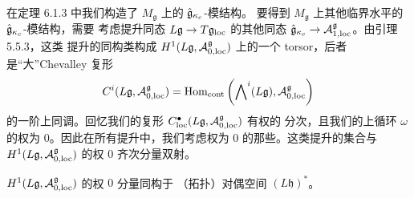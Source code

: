 在定理 6.1.3 中我们构造了 $M_{\mathfrak g}$ 上的 $\hat{\mathfrak{g}}_{\kappa_c}$-模结构。
要得到 $M_{\mathfrak g}$ 上其他临界水平的 $\hat{\mathfrak{g}}_{\kappa_c}$-模结构，需要
考虑提升同态 $L\mathfrak{g}\to T\mathfrak{g}_{\mathrm{loc}}$ 的其他同态
$\hat{\mathfrak{g}}_{\kappa_c}\to\mathcal{A}^{\mathfrak g}_{1,\mathrm{loc}}$。由引理 5.5.3，这类
提升的同构类构成 $H^1(L\mathfrak{g},\mathcal{A}^{\mathfrak g}_{0,\mathrm{loc}})$ 上的一个
torsor，后者是“大”Chevalley 复形
\[
    C^i(L\mathfrak{g},\mathcal{A}^{\mathfrak g}_{0,\mathrm{loc}})
    =\operatorname{Hom}_{\mathrm{cont}}\left(\bigwedge\nolimits^i(L\mathfrak{g}),
    \mathcal{A}^{\mathfrak g}_{0,\mathrm{loc}}\right)
\]
的一阶上同调。回忆我们的复形
$C^\bullet_{\mathrm{loc}}(L\mathfrak{g},\mathcal{A}^{\mathfrak g}_{0,\mathrm{loc}})$ 有权的
分次，且我们的上循环 $\omega$ 的权为 $0$。因此在所有提升中，我们考虑权为
$0$ 的那些。这类提升的集合与 $H^1(L\mathfrak{g},\mathcal{A}^{\mathfrak g}_{0,\mathrm{loc}})$
的权 $0$ 齐次分量双射。

\renewcommand{\thelemma}{6.1.4}
\begin{lemma}
    $H^1(L\mathfrak{g},\mathcal{A}^{\mathfrak g}_{0,\mathrm{loc}})$ 的权 $0$ 分量同构于
    （拓扑）对偶空间 $(L\mathfrak h)^*$。
\end{lemma}

